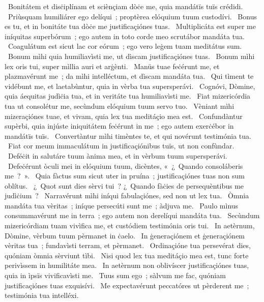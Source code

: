 ~Bonitátem et disċiplínam et sciènçiam dòċe me, quia mandátïs tuïs crédidi. 
~Priùsquam humiliárer ego delíqui~; proptèrea elóquium tuum custodívi. 
~Bonus es tu, et in bonitáte tua dòċe me justificaçiónes tuas. 
~Multiplicáta est super me iníquitas superbórum~; ego autem in toto corde meo scrutábor mandáta tua. 
~Coagulátum est sicut lac cor eórum~; ego vero leġem tuam meditátus sum. 
~Bonum mìhi quia humiliavìsti me, ut dìscam justificaçiónes tuas. 
~Bonum mìhi lex oris tui, super mìllia auri et arġènti. 
~Manüs tuae feċérunt me, et plazmavérunt me~; da mìhi intelléctum, et dìscam mandáta tua. 
~Qui tìment te vidébunt me, et laetabùntur, quia in vèrba tua supersperávi. 
~Cognóvi, Dòmine, quia áequitas judìċia tua, et in veritáte tua humiliavìsti me. 
~Fiat mizericórdia tua ut consolétur me, secùndum elóquium tuum servo tuo. 
~Vèniant mìhi mizeraçiónes tuae, et vivam, quia lex tua meditáçio mea est. 
~Confundàntur supèrbi, quia injúste iniquitátem feċérunt in me~; ego autem exerċébor in mandátïs tuïs. 
~Convertàntur mìhi timèntes te, et qui novérunt testimónia tua. 
~Fiat cor meum immaculátum in justificaçiónibus tuïs, ut non confùndar. 
~Deféċit in salutáre tuum ànima mea, et in vèrbum tuum supersperávi. 
~Defeċérunt òculi mei in elóquium tuum, dicèntes, «~¿~Quando consoláberis me~?~». 
~Quia fàctus sum sicut uter in pruína~; justificaçiónes tuas non sum oblítus. 
~¿~Quot sunt dies sèrvi tui~? ¿~Quando fàċies de persequèntibus me judìċium~? 
~Narravérunt mìhi iníqui fabulaçiónes, sed non ut lex tua. 
~Òmnia mandáta tua vèritas~; iníque persecúti sunt me~; àdjuva me. 
~Paulo mìnus consummavérunt me in terra~; ego autem non derelíqui mandáta tua. 
~Secùndum mizericórdiam tuam vivìfica me, et custódiem testimónia oris tui. 
~In aetèrnum, Dòmine, vèrbum tuum pèrmanet in ċaelo. 
~In ġeneraçiónem et ġeneraçiónem vèritas tua~; fundavìsti terram, et pèrmanet. 
~Ordinaçióne tua persevérat dies, quóniam òmnia sèrviunt tìbi. 
~Nisi quod lex tua meditáçio mea est, tunc forte perivìssem in humilitáte mea. 
~In aetèrnum non oblivíscer justificaçiónes tuas, quia in ìpsïs vivificavìsti me. 
~Tuus sum ego~; sàlvum me fac, quóniam justificaçiónes tuas exquisívi. 
~Me expectavérunt peccatóres ut pèrderent me~; testimónia tua intelléxi. 
